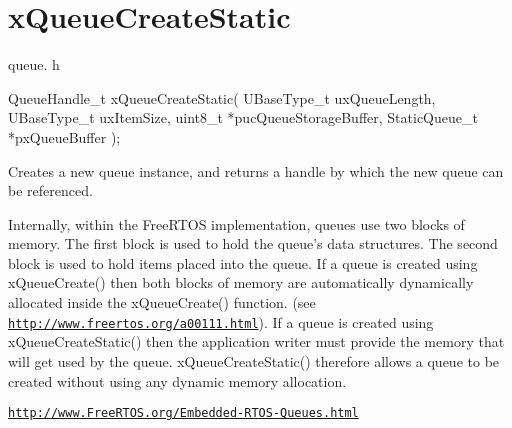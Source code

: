 \hypertarget{group__xQueueCreateStatic}{\section{x\-Queue\-Create\-Static}
\label{group__xQueueCreateStatic}
}
queue. h 
\begin{DoxyPre}
 QueueHandle\_t xQueueCreateStatic(
                              UBaseType\_t uxQueueLength,
                              UBaseType\_t uxItemSize,
                              uint8\_t *pucQueueStorageBuffer,
                              StaticQueue\_t *pxQueueBuffer
                          );
   \end{DoxyPre}


Creates a new queue instance, and returns a handle by which the new queue can be referenced.

Internally, within the Free\-R\-T\-O\-S implementation, queues use two blocks of memory. The first block is used to hold the queue's data structures. The second block is used to hold items placed into the queue. If a queue is created using x\-Queue\-Create() then both blocks of memory are automatically dynamically allocated inside the x\-Queue\-Create() function. (see \href{http://www.freertos.org/a00111.html}{\tt http\-://www.\-freertos.\-org/a00111.\-html}). If a queue is created using x\-Queue\-Create\-Static() then the application writer must provide the memory that will get used by the queue. x\-Queue\-Create\-Static() therefore allows a queue to be created without using any dynamic memory allocation.

\href{http://www.FreeRTOS.org/Embedded-RTOS-Queues.html}{\tt http\-://www.\-Free\-R\-T\-O\-S.\-org/\-Embedded-\/\-R\-T\-O\-S-\/\-Queues.\-html}


